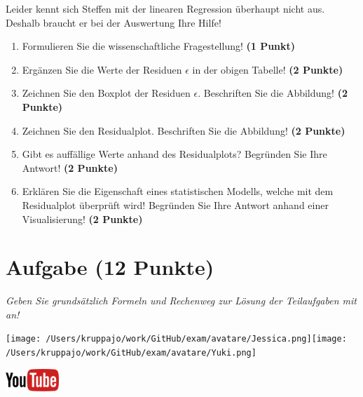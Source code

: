 \documentclass[a4paper, 9pt]{scrartcl}\usepackage[]{graphicx}\usepackage[]{xcolor}
\begin{document}
Leider kennt sich Steffen mit der linearen Regression überhaupt nicht aus. Deshalb braucht er bei der Auswertung Ihre Hilfe!

\begin{enumerate}
  \item Formulieren Sie die wissenschaftliche Fragestellung! \textbf{(1 Punkt)}
\item Ergänzen Sie die Werte der Residuen $\epsilon$ in der obigen Tabelle! \textbf{(2 Punkte)}
\item Zeichnen Sie den Boxplot der Residuen $\epsilon$. Beschriften Sie die Abbildung! \textbf{(2 Punkte)}
\item Zeichnen Sie den Residualplot. Beschriften Sie die Abbildung! \textbf{(2 Punkte)}
\item Gibt es auffällige Werte anhand des Residualplots? Begründen Sie Ihre Antwort! \textbf{(2 Punkte)}
\item Erklären Sie die Eigenschaft eines statistischen Modells, welche mit dem Residualplot überprüft wird! Begründen Sie Ihre Antwort anhand einer Visualisierung! \textbf{(2 Punkte)}
\end{enumerate}
 
\clearpage

\section{Aufgabe \hfill (12 Punkte)}

\textit{Geben Sie grundsätzlich Formeln und Rechenweg zur Lösung der Teilaufgaben mit an!} \\[1Ex]
 

 
\begin{minipage}[t]{0.5\textwidth}
\texttt{[image: /Users/kruppajo/work/GitHub/exam/avatare/Jessica.png]}\hspace{-4mm}\texttt{[image: /Users/kruppajo/work/GitHub/exam/avatare/Yuki.png]}
\end{minipage}
\begin{minipage}[t]{0.5\textwidth}
\hfill
\href{https://youtu.be/kHmfEmU6lrk}{\includegraphics[width = 2cm]{img/youtube}}
\end{minipage}
\vspace{1ex}
\end{document}
